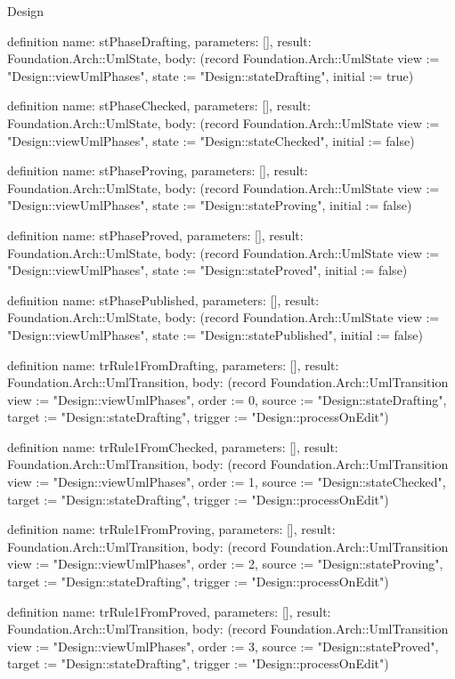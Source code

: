 \begin{lexlean}{Design}
\begin{semanticmodule}
definition{
  name: stPhaseDrafting,
  parameters: [],
  result: Foundation.Arch::UmlState,
  body: (record Foundation.Arch::UmlState {view := "Design::viewUmlPhases", state := "Design::stateDrafting", initial := true})
}

definition{
  name: stPhaseChecked,
  parameters: [],
  result: Foundation.Arch::UmlState,
  body: (record Foundation.Arch::UmlState {view := "Design::viewUmlPhases", state := "Design::stateChecked", initial := false})
}

definition{
  name: stPhaseProving,
  parameters: [],
  result: Foundation.Arch::UmlState,
  body: (record Foundation.Arch::UmlState {view := "Design::viewUmlPhases", state := "Design::stateProving", initial := false})
}

definition{
  name: stPhaseProved,
  parameters: [],
  result: Foundation.Arch::UmlState,
  body: (record Foundation.Arch::UmlState {view := "Design::viewUmlPhases", state := "Design::stateProved", initial := false})
}

definition{
  name: stPhasePublished,
  parameters: [],
  result: Foundation.Arch::UmlState,
  body: (record Foundation.Arch::UmlState {view := "Design::viewUmlPhases", state := "Design::statePublished", initial := false})
}

definition{
  name: trRule1FromDrafting,
  parameters: [],
  result: Foundation.Arch::UmlTransition,
  body: (record Foundation.Arch::UmlTransition {view := "Design::viewUmlPhases", order := 0, source := "Design::stateDrafting", target := "Design::stateDrafting", trigger := "Design::processOnEdit"})
}

definition{
  name: trRule1FromChecked,
  parameters: [],
  result: Foundation.Arch::UmlTransition,
  body: (record Foundation.Arch::UmlTransition {view := "Design::viewUmlPhases", order := 1, source := "Design::stateChecked", target := "Design::stateDrafting", trigger := "Design::processOnEdit"})
}

definition{
  name: trRule1FromProving,
  parameters: [],
  result: Foundation.Arch::UmlTransition,
  body: (record Foundation.Arch::UmlTransition {view := "Design::viewUmlPhases", order := 2, source := "Design::stateProving", target := "Design::stateDrafting", trigger := "Design::processOnEdit"})
}

definition{
  name: trRule1FromProved,
  parameters: [],
  result: Foundation.Arch::UmlTransition,
  body: (record Foundation.Arch::UmlTransition {view := "Design::viewUmlPhases", order := 3, source := "Design::stateProved", target := "Design::stateDrafting", trigger := "Design::processOnEdit"})
}


\end{semanticmodule}
\end{lexlean}
